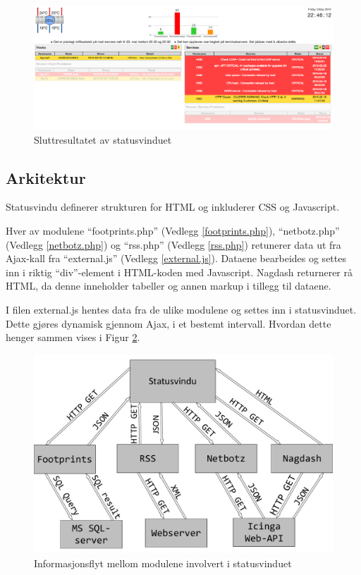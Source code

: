 \begin{figure}[H]
    \centering
    \includegraphics[scale=0.3]{img/statusvindu_final}
    \caption{Sluttresultatet av statusvinduet}
    \label{statusvindu_final}
\end{figure}

\subsection{Arkitektur}
Statusvindu definerer strukturen for HTML og inkluderer CSS og Javascript.

Hver av modulene ``footprints.php'' (Vedlegg \ref{footprints.php}), ``netbotz.php'' (Vedlegg \ref{netbotz.php}) og ``rss.php'' (Vedlegg \ref{rss.php}) retunerer data ut fra Ajax-kall fra ``external.js'' (Vedlegg \ref{external.js}). Dataene bearbeides og settes inn i riktig ``div''-element i HTML-koden med Javascript. Nagdash returnerer rå HTML, da denne inneholder tabeller og annen markup i tillegg til dataene.

I filen external.js hentes data fra de ulike modulene og settes inn i statusvinduet. Dette gjøres dynamisk gjennom Ajax, i et bestemt intervall. Hvordan dette henger sammen vises i Figur \ref{statusvindu_arkitektur}.

\begin{figure}[H]
    \centering
    \includegraphics[scale=0.4]{img/statusvindu_arkitektur}
    \caption{Informasjonsflyt mellom modulene involvert i statusvinduet}
    \label{statusvindu_arkitektur}
\end{figure}

